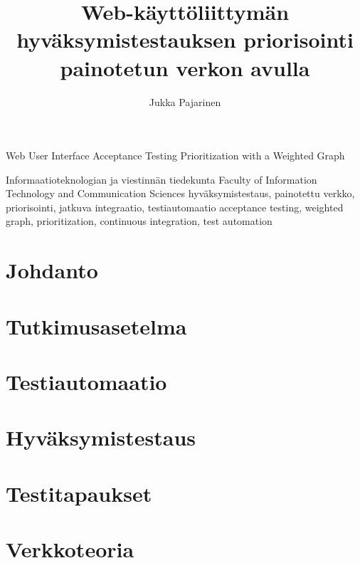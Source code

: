 \documentclass[finnish, authoryear]{config/tauthesis}
\theoremstyle{definition}
\begin{document}
\frontmatter
\title
  {Web-käyttöliittymän hyväksymistestauksen priorisointi painotetun verkon avulla}
  {Web User Interface Acceptance Testing Prioritization with a Weighted Graph}
\subtitle{}{}
\author{Jukka Pajarinen}
\facultyname
  {Informaatioteknologian ja viestinnän tiedekunta}
  {Faculty of Information Technology and Communication Sciences}
\keywords
  {hyväksymistestaus, painotettu verkko, priorisointi, jatkuva integraatio, testiautomaatio}
  {acceptance testing, weighted graph, prioritization, continuous integration, test automation}
\maketitle
{}
\tableofcontents
\listoffigures
\listoftables
\glossary

\mainmatter
\chapter{Johdanto}
\label{ch:johdanto}

\chapter{Tutkimusasetelma}
\label{ch:tutkimusasetelma}

\chapter{Testiautomaatio}
\label{ch:testiautomaatio}

\chapter{Hyväksymistestaus}
\label{ch:hyvaksymistestaus}

\chapter{Testitapaukset}
\label{ch:testitapaukset}

\chapter{Verkkoteoria}
\label{ch:verkkoteoria}

\end{document}
